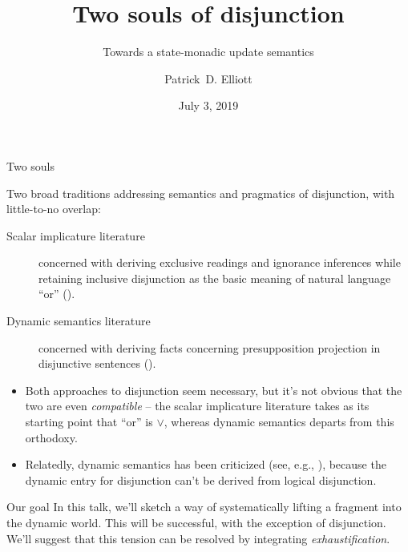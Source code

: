 \documentclass{beamer}
\title{Two souls of disjunction}
\subtitle{Towards a state-monadic update semantics}
\author{Patrick~D. Elliott}
\date{July 3, 2019}
\institute{Asymmetries in Language: Presuppositions and beyond -- Berlin}
\begin{document}
\begin{frame}
 \maketitle
\end{frame}

\begin{frame}[allowframebreaks]{Two souls}

  Two broad traditions addressing semantics and pragmatics of disjunction, with little-to-no overlap:

  \begin{description}

    \item[Scalar implicature literature]concerned with deriving exclusive readings and ignorance inferences while retaining inclusive disjunction as the basic meaning of natural language \enquote{or} (\citealt{sauerland2004scalar}).

    \item[Dynamic semantics literature] concerned with deriving facts concerning presupposition projection in disjunctive sentences (\citealt{heim1983,beaver_presupposition_2001}).

  \end{description}

  \framebreak

  \begin{itemize}

      \item Both approaches to disjunction seem necessary, but it's not obvious that the two are even \textit{compatible} -- the scalar implicature literature takes as its starting point that \enquote{or} is \(\vee\), whereas dynamic semantics departs from this orthodoxy.

      \item Relatedly, dynamic semantics has been criticized (see, e.g., \citealt{schlenker_local_2009}), because the dynamic entry for disjunction can't be derived from logical disjunction.

  \end{itemize}

  \begin{block}{Our goal}
      In this talk, we'll sketch a way of systematically lifting a fragment into the dynamic world. This will be successful, with the exception of disjunction. We'll suggest that this tension can be resolved by integrating \textit{exhaustification}.
      \end{block}

\end{frame}
\end{document}
